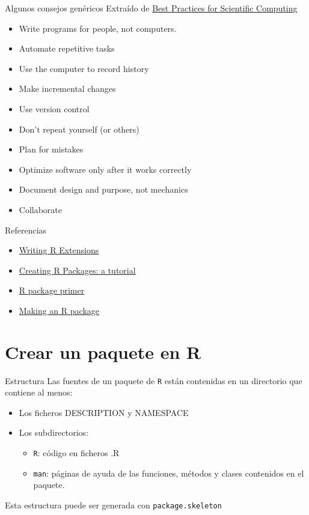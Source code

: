 \documentclass[xcolor={usenames,svgnames,dvipsnames}]{beamer}
\begin{document}
\begin{frame}[label={sec:org98bb83a}]{Algunos consejos genéricos}
Extraído de \href{http://arxiv.org/abs/1210.0530}{Best Practices for Scientific Computing}

\begin{itemize}
\item Write programs for people, not computers.
\item Automate repetitive tasks
\item Use the computer to record history
\item Make incremental changes
\item Use version control
\item Don't repeat yourself (or others)
\item Plan for mistakes
\item Optimize software only after it works correctly
\item Document design and purpose, not mechanics
\item Collaborate
\end{itemize}
\end{frame}

\begin{frame}[label={sec:orgedf6c97}]{}
\begin{block}{Referencias}
\begin{itemize}
\item \href{http://cran.r-project.org/doc/manuals/r-release/R-exts.html}{Writing R Extensions}
\item \href{http://cran.r-project.org/doc/contrib/Leisch-CreatingPackages.pdf}{Creating R Packages: a tutorial}
\item \href{http://kbroman.org/pkg\_primer/}{R package primer}
\item \href{http://portal.stats.ox.ac.uk/userdata/ruth/APTS2012/Rcourse10.pdf}{Making an R package}
\end{itemize}
\end{block}
\end{frame}

\section{Crear un paquete en R}
\label{sec:orgf151845}

\begin{frame}[label={sec:org5feb013},fragile]{Estructura}
 Las fuentes de un paquete de \texttt{R} están contenidas en un directorio que contiene al menos:
\begin{itemize}
\item Los ficheros DESCRIPTION y NAMESPACE
\item Los subdirectorios:
\begin{itemize}
\item \texttt{R}: código en ficheros .R
\item \texttt{man}: páginas de ayuda de las funciones, métodos y clases
contenidos en el paquete.
\end{itemize}
\end{itemize}
Esta estructura puede ser generada con \texttt{package.skeleton}
\end{frame}
\end{document}
